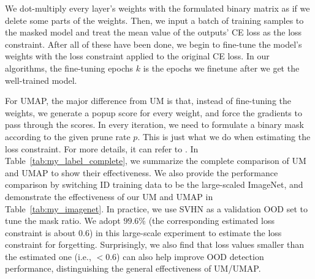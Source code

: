 \documentclass{article}
\theoremstyle{plain}
\theoremstyle{definition}
\theoremstyle{remark}
\begin{document}
We dot-multiply every layer's weights with the formulated binary matrix as if we delete some parts of the weights. Then, we input a batch of training samples to the masked model and treat the mean value of the outputs' CE loss as the loss constraint. After all of these have been done, we begin to fine-tune the model's weights with the loss constraint applied to the original CE loss. In our algorithms, the fine-tuning epochs $k$ is the epochs we finetune after we get the well-trained model.

For UMAP, the major difference from UM is that, instead of fine-tuning the weights, we generate a popup score for every weight, and force the gradients to pass through the scores. In every iteration, we need to formulate a binary mask according to the given prune rate $p$. This is just what we do when estimating the loss constraint. For more details, it can refer to \citep{ramanujan2020s}. In Table~\ref{tab:my_label_complete}, we summarize the complete comparison of UM and UMAP to show their effectiveness. We also provide the performance comparison by switching ID training data to be the large-scaled ImageNet, and demonstrate the effectiveness of our UM and UMAP in Table~\ref{tab:my_imagenet}. In practice, we use SVHN as a validation OOD set to tune the mask ratio. We adopt $99.6\%$ (the corresponding estimated loss constraint is about $0.6$) in this large-scale experiment to estimate the loss constraint for forgetting. Surprisingly, we also find that loss values smaller than the estimated one (i.e., $<0.6$) can also help improve OOD detection performance, distinguishing the general effectiveness of UM/UMAP.
\end{document}
